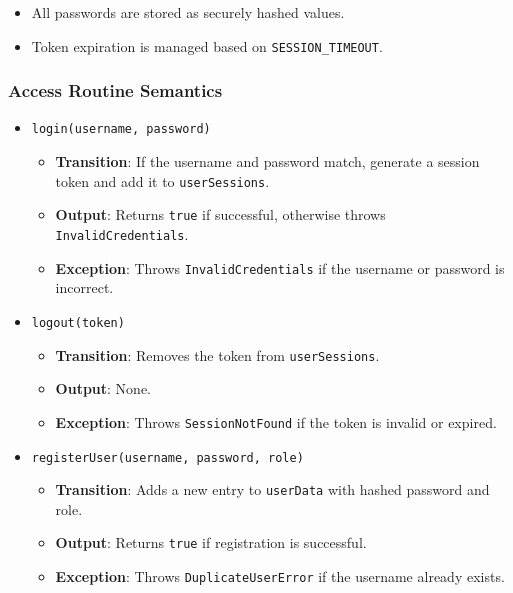 \documentclass[12pt, titlepage]{article}
\begin{document}
\begin{itemize}
    \item All passwords are stored as securely hashed values.
    \item Token expiration is managed based on \texttt{SESSION\_TIMEOUT}.
\end{itemize}

\subsubsection{Access Routine Semantics}

\begin{itemize}
    \item \texttt{login(username, password)}
    \begin{itemize}
        \item \textbf{Transition}: If the username and password match, generate a session token and add it to \texttt{userSessions}.
        \item \textbf{Output}: Returns \texttt{true} if successful, otherwise throws \texttt{InvalidCredentials}.
        \item \textbf{Exception}: Throws \texttt{InvalidCredentials} if the username or password is incorrect.
    \end{itemize}

    \item \texttt{logout(token)}
    \begin{itemize}
        \item \textbf{Transition}: Removes the token from \texttt{userSessions}.
        \item \textbf{Output}: None.
        \item \textbf{Exception}: Throws \texttt{SessionNotFound} if the token is invalid or expired.
    \end{itemize}

    \item \texttt{registerUser(username, password, role)}
    \begin{itemize}
        \item \textbf{Transition}: Adds a new entry to \texttt{userData} with hashed password and role.
        \item \textbf{Output}: Returns \texttt{true} if registration is successful.
        \item \textbf{Exception}: Throws \texttt{DuplicateUserError} if the username already exists.
    \end{itemize}


\end{itemize}
\end{document}
